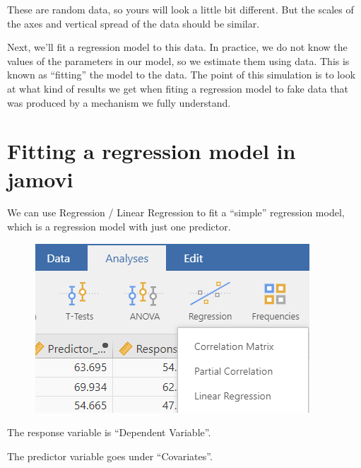 \documentclass[
  letterpaper,
  DIV=11,
  numbers=noendperiod]{scrreprt}
\begin{document}
These are random data, so yours will look a little bit different. But
the scales of the axes and vertical spread of the data should be
similar.

Next, we'll fit a regression model to this data. In practice, we do not
know the values of the parameters in our model, so we estimate them
using data. This is known as ``fitting'' the model to the data. The
point of this simulation is to look at what kind of results we get when
fiting a regression model to fake data that was produced by a mechanism
we fully understand.

\hypertarget{fitting-a-regression-model-in-jamovi}{%
\section{Fitting a regression model in
jamovi}\label{fitting-a-regression-model-in-jamovi}}

We can use Regression / Linear Regression to fit a ``simple'' regression
model, which is a regression model with just one predictor.

\begin{figure}

{\centering \includegraphics{images/mod2_pt1 (13)-01.png}

}

\end{figure}

The response variable is ``Dependent Variable''.

The predictor variable goes under ``Covariates''.
\end{document}

